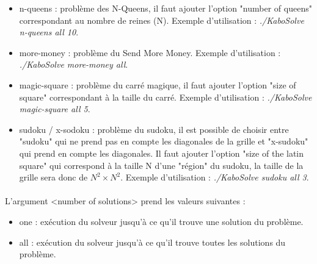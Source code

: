     \begin{itemize}
        \item n-queens : problème des N-Queens, il faut ajouter l'option "number of queens" correspondant au nombre de reines (N). Exemple d'utilisation : \textit{./KaboSolve n-queens all 10}.
        
        \item more-money : problème du Send More Money. Exemple d'utilisation : \textit{./KaboSolve more-money all}.
        
        \item magic-square : problème du carré magique, il faut ajouter l'option "size of square" correspondant à la taille du carré. Exemple d'utilisation : \textit{./KaboSolve magic-square all 5}.
        
        \item sudoku / x-sodoku : problème du sudoku, il est possible de choisir entre "sudoku" qui ne prend pas en compte les diagonales de la grille et "x-sudoku" qui prend en compte les diagonales. Il faut ajouter l'option "size of the latin square" qui correspond à la taille N d'une "région" du sudoku, la taille de la grille sera donc de $N^{2} \times N^{2}$. Exemple d'utilisation : \textit{./KaboSolve sudoku all 3}.
    \end{itemize}
    
    \paragraph{}
    L'argument <number of solutions> prend les valeurs suivantes :
    
    \begin{itemize}
        \item one : exécution du solveur jusqu'à ce qu'il trouve une solution du problème.
        \item all : exécution du solveur jusqu'à ce qu'il trouve toutes les solutions du problème.
    \end{itemize}
